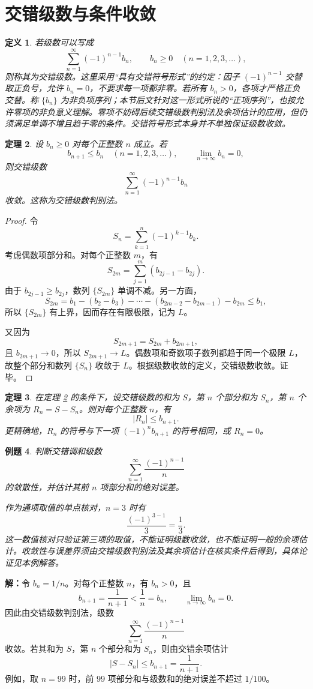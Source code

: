 \documentclass[UTF8,fontset=fandol,11pt]{ctexart}
\newtheorem{definition}{定义}[section]
\newtheorem{theorem}[definition]{定理}
\newtheorem{example}[definition]{例题}
\begin{document}
\section{交错级数与条件收敛}\label{sec:S04}
\begin{definition}
若级数可以写成
\[
\sum_{n=1}^{\infty}(-1)^{n-1}b_n,
\qquad b_n\geq 0\quad(n=1,2,3,\ldots),
\]
则称其为交错级数。这里采用“具有交错符号形式”的约定：因子 $(-1)^{n-1}$ 交替取正负号，允许 $b_n=0$，不要求每一项都非零。若所有 $b_n>0$，各项才严格正负交替。称 $\{b_n\}$ 为非负项序列；本节后文针对这一形式所说的“正项序列”，也按允许零项的非负意义理解。零项不妨碍后续交错级数判别法及余项估计的应用，但仍须满足单调不增且趋于零的条件。交错符号形式本身并不单独保证级数收敛。\label{def:alternating-series}
\end{definition}
\begin{theorem}
设 $b_n\geq0$ 对每个正整数 $n$ 成立。若
\[
b_{n+1}\leq b_n\quad(n=1,2,3,\ldots),
\qquad \lim_{n\to\infty}b_n=0,
\]
则交错级数
\[
\sum_{n=1}^{\infty}(-1)^{n-1}b_n
\]
收敛。这称为交错级数判别法。\label{thm:alternating-test}
\end{theorem}
\begin{proof}
令
\[
S_n=\sum_{k=1}^{n}(-1)^{k-1}b_k.
\]
考虑偶数项部分和。对每个正整数 $m$，有
\[
S_{2m}=\sum_{j=1}^{m}(b_{2j-1}-b_{2j}).
\]
由于 $b_{2j-1}\geq b_{2j}$，数列 $\{S_{2m}\}$ 单调不减。另一方面，
\[
S_{2m}=b_1-(b_2-b_3)-\cdots-(b_{2m-2}-b_{2m-1})-b_{2m}\leq b_1,
\]
所以 $\{S_{2m}\}$ 有上界，因而存在有限极限，记为 $L$。

又因为
\[
S_{2m+1}=S_{2m}+b_{2m+1},
\]
且 $b_{2m+1}\to0$，所以 $S_{2m+1}\to L$。偶数项和奇数项子数列都趋于同一个极限 $L$，故整个部分和数列 $\{S_n\}$ 收敛于 $L$。根据级数收敛的定义，交错级数收敛。证毕。
\end{proof}
\begin{theorem}
在定理 \ref{thm:alternating-test} 的条件下，设交错级数的和为 $S$，第 $n$ 个部分和为 $S_n$，第 $n$ 个余项为 $R_n=S-S_n$。则对每个正整数 $n$，有
\[
|R_n|\leq b_{n+1}.
\]
更精确地，$R_n$ 的符号与下一项 $(-1)^n b_{n+1}$ 的符号相同，或 $R_n=0$。\label{thm:alternating-remainder}
\end{theorem}
\begin{example}
判断交错调和级数
\[
\sum_{n=1}^{\infty}\frac{(-1)^{n-1}}{n}
\]
的敛散性，并估计其前 $n$ 项部分和的绝对误差。

作为通项取值的单点核对，$n=3$ 时有
\[
\frac{(-1)^{3-1}}{3}=\frac13.
\]
这一数值核对只验证第三项的取值，不能证明级数收敛，也不能证明一般的余项估计。收敛性与误差界须由交错级数判别法及其余项估计在核实条件后得到，具体论证见本例解答。
\end{example}
\par\noindent\textbf{解：}令 $b_n=1/n$。对每个正整数 $n$，有 $b_n>0$，且
\[
b_{n+1}=\frac{1}{n+1}<\frac1n=b_n,
\qquad \lim_{n\to\infty}b_n=0.
\]
因此由交错级数判别法，级数
\[
\sum_{n=1}^{\infty}\frac{(-1)^{n-1}}{n}
\]
收敛。若其和为 $S$，第 $n$ 个部分和为 $S_n$，则由交错余项估计
\[
|S-S_n|\leq b_{n+1}=\frac{1}{n+1}.
\]
例如，取 $n=99$ 时，前 $99$ 项部分和与级数和的绝对误差不超过 $1/100$。
\end{document}
